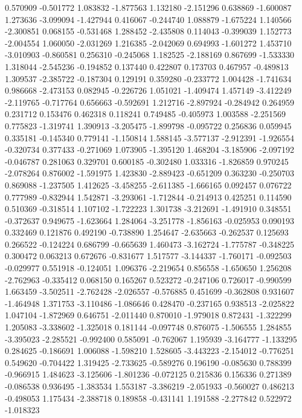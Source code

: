 0.570909
-0.501772
1.083832
-1.877563
1.132180
-2.151296
0.638869
-1.600087
1.273636
-3.099094
-1.427944
0.416067
-0.244740
1.088879
-1.675224
1.140566
-2.300851
0.068155
-0.531468
1.288452
-2.435808
0.114043
-0.399039
1.152773
-2.004554
1.060050
-2.031269
1.216385
-2.042069
0.694993
-1.601272
1.453710
-3.010903
-0.860581
0.256310
-0.245068
1.182525
-2.188169
0.867699
-1.533330
1.318044
-2.545236
-0.194852
0.137440
0.422807
0.173703
0.467957
-0.489813
1.309537
-2.385722
-0.187304
0.129191
0.359280
-0.233772
1.004428
-1.741634
0.986668
-2.473153
0.082945
-0.226726
1.051021
-1.409474
1.457149
-3.412249
-2.119765
-0.717764
0.656663
-0.592691
1.212716
-2.897924
-0.284942
0.264959
0.231712
0.153476
0.462318
0.118241
0.749485
-0.405973
1.003588
-2.251569
0.775823
-1.319741
1.390913
-3.205475
-1.899798
-0.095722
0.256836
0.059945
0.335181
-0.145340
0.779141
-1.150814
1.588145
-3.577137
-2.912391
-1.926554
-0.320734
0.377433
-0.271069
1.073905
-1.395120
1.468204
-3.185906
-2.097192
-0.046787
0.281063
0.329701
0.600185
-0.302480
1.033316
-1.826859
0.970245
-2.078264
0.876002
-1.591975
1.423830
-2.889423
-0.651209
0.363230
-0.250703
0.869088
-1.237505
1.412625
-3.458255
-2.611385
-1.666165
0.092457
0.076722
0.777989
-0.832944
1.542871
-3.293061
-1.712844
-0.214913
0.425251
0.114590
0.510369
-0.318514
1.107102
-1.722223
1.301738
-3.212691
-1.491910
0.348551
-0.372637
0.949675
-1.623664
1.284064
-3.251778
-1.856163
-0.025953
0.090193
0.332469
0.121876
0.492190
-0.738890
1.254647
-2.635663
-0.262537
0.125693
0.266522
-0.124224
0.686799
-0.665639
1.460473
-3.162724
-1.775787
-0.348225
0.300472
0.063213
0.672676
-0.831677
1.517577
-3.144337
-1.760171
-0.092503
-0.029977
0.551918
-0.124051
1.096376
-2.219654
0.856558
-1.650650
1.256208
-2.762963
-0.335412
0.068150
0.165267
0.523272
-0.247106
0.726017
-0.990599
1.663459
-3.502511
-2.762428
-2.026557
-0.576885
0.451699
-0.362808
0.931607
-1.464948
1.371753
-3.110486
-1.086646
0.428470
-0.237165
0.938513
-2.025822
1.047104
-1.872969
0.646751
-2.011440
0.870010
-1.979018
0.872431
-1.322299
1.205083
-3.338602
-1.325018
0.181144
-0.097748
0.876075
-1.506555
1.284855
-3.395023
-2.285521
-0.992400
0.585091
-0.762067
1.195939
-3.164777
-1.133295
0.284625
-0.186691
1.006088
-1.598210
1.528605
-3.443223
-2.154012
-0.776251
0.549620
-0.704422
1.319425
-2.733625
-0.589276
0.196190
-0.085630
0.788399
-0.966915
1.484623
-3.125606
-1.801236
-0.072125
0.215836
0.156336
0.271389
-0.086538
0.936495
-1.383534
1.553187
-3.386219
-2.051933
-0.560027
0.486213
-0.498053
1.175434
-2.388718
0.189858
-0.431141
1.191588
-2.277842
0.522972
-1.018323
